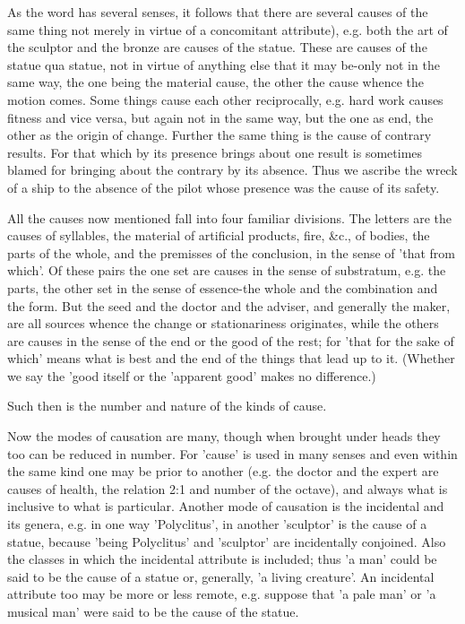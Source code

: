 As the word has several senses, it follows that there are several
causes of the same thing not merely in virtue of a concomitant attribute),
e.g. both the art of the sculptor and the bronze are causes of the
statue. These are causes of the statue qua statue, not in virtue of
anything else that it may be-only not in the same way, the one being
the material cause, the other the cause whence the motion comes. Some
things cause each other reciprocally, e.g. hard work causes fitness
and vice versa, but again not in the same way, but the one as end,
the other as the origin of change. Further the same thing is the cause
of contrary results. For that which by its presence brings about one
result is sometimes blamed for bringing about the contrary by its
absence. Thus we ascribe the wreck of a ship to the absence of the
pilot whose presence was the cause of its safety. 

All the causes now mentioned fall into four familiar divisions. The
letters are the causes of syllables, the material of artificial products,
fire, &c., of bodies, the parts of the whole, and the premisses of
the conclusion, in the sense of 'that from which'. Of these pairs
the one set are causes in the sense of substratum, e.g. the parts,
the other set in the sense of essence-the whole and the combination
and the form. But the seed and the doctor and the adviser, and generally
the maker, are all sources whence the change or stationariness originates,
while the others are causes in the sense of the end or the good of
the rest; for 'that for the sake of which' means what is best and
the end of the things that lead up to it. (Whether we say the 'good
itself or the 'apparent good' makes no difference.) 

Such then is the number and nature of the kinds of cause.

Now the modes of causation are many, though when brought under heads
they too can be reduced in number. For 'cause' is used in many senses
and even within the same kind one may be prior to another (e.g. the
doctor and the expert are causes of health, the relation 2:1 and number
of the octave), and always what is inclusive to what is particular.
Another mode of causation is the incidental and its genera, e.g. in
one way 'Polyclitus', in another 'sculptor' is the cause of a statue,
because 'being Polyclitus' and 'sculptor' are incidentally conjoined.
Also the classes in which the incidental attribute is included; thus
'a man' could be said to be the cause of a statue or, generally, 'a
living creature'. An incidental attribute too may be more or less
remote, e.g. suppose that 'a pale man' or 'a musical man' were said
to be the cause of the statue. 

